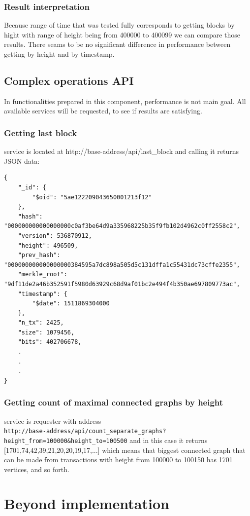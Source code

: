 \documentclass[12pt, en, eng, oneside]{mgr}
\begin{document}
\subsection{Result interpretation}
Because range of time that was tested fully corresponds to getting blocks by hight with range of height being from 400000 to 400099 we can compare those results. There seams to be no significant difference in performance between getting by height and by timestamp.

\section{Complex operations API}
In functionalities prepared in this component, performance is not main goal. All available services will be requested, to see if results are satisfying.

\subsection{Getting last block}
service is located at http://base-address/api/last\_block and calling it returns JSON data:
\begin{verbatim}
{
    "_id": {
        "$oid": "5ae122209043650001213f12"
    },
    "hash": "000000000000000000c0af3be64d9a335968225b35f9fb102d4962c0ff2558c2",
    "version": 536870912,
    "height": 496509,
    "prev_hash": "000000000000000000384595a7dc898a505d5c131dffa1c55431dc73cffe2355",
    "merkle_root": "9df11de2a46b352591f5980d63929c68d9af01bc2e494f4b350ae697809773ac",
    "timestamp": {
        "$date": 1511869304000
    },
    "n_tx": 2425,
    "size": 1079456,
    "bits": 402706678,
    .
    .
    .
}
\end{verbatim}

\subsection{Getting count of maximal connected graphs by height}
service is requester with address
\\ \verb|http://base-address/api/count_separate_graphs?height_from=100000&height_to=100500|
and in this case it returns [1701,74,42,39,21,20,20,19,17,...] which means that biggest connected graph that can be made from transactions with height from 100000 to 100150 has 1701 vertices, and so forth.


\chapter{Beyond implementation}
\end{document}
